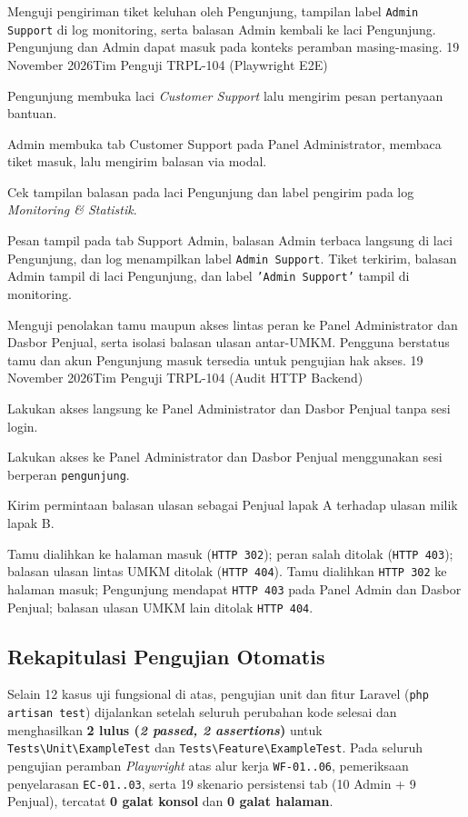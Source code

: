 {Menguji pengiriman tiket keluhan oleh Pengunjung, tampilan label \texttt{Admin Support} di log monitoring, serta balasan Admin kembali ke laci Pengunjung.}
{Pengunjung dan Admin dapat masuk pada konteks peramban masing-masing.}
{19 November 2026}{Tim Penguji TRPL-104 (Playwright E2E)}
{\begin{uclist}
  \item Pengunjung membuka laci \textit{Customer Support} lalu mengirim pesan pertanyaan bantuan.
  \item Admin membuka tab Customer Support pada Panel Administrator, membaca tiket masuk, lalu mengirim balasan via modal.
  \item Cek tampilan balasan pada laci Pengunjung dan label pengirim pada log \textit{Monitoring \& Statistik}.
\end{uclist}}
{Pesan tampil pada tab Support Admin, balasan Admin terbaca langsung di laci Pengunjung, dan log menampilkan label \texttt{Admin Support}.}
{Tiket terkirim, balasan Admin tampil di laci Pengunjung, dan label \texttt{'Admin Support'} tampil di monitoring.}

{Menguji penolakan tamu maupun akses lintas peran ke Panel Administrator dan Dasbor Penjual, serta isolasi balasan ulasan antar-UMKM.}
{Pengguna berstatus tamu dan akun Pengunjung masuk tersedia untuk pengujian hak akses.}
{19 November 2026}{Tim Penguji TRPL-104 (Audit HTTP Backend)}
{\begin{uclist}
  \item Lakukan akses langsung ke Panel Administrator dan Dasbor Penjual tanpa sesi login.
  \item Lakukan akses ke Panel Administrator dan Dasbor Penjual menggunakan sesi berperan \texttt{pengunjung}.
  \item Kirim permintaan balasan ulasan sebagai Penjual lapak A terhadap ulasan milik lapak B.
\end{uclist}}
{Tamu dialihkan ke halaman masuk (\texttt{HTTP 302}); peran salah ditolak (\texttt{HTTP 403}); balasan ulasan lintas UMKM ditolak (\texttt{HTTP 404}).}
{Tamu dialihkan \texttt{HTTP 302} ke halaman masuk; Pengunjung mendapat \texttt{HTTP 403} pada Panel Admin dan Dasbor Penjual; balasan ulasan UMKM lain ditolak \texttt{HTTP 404}.}

\subsection{Rekapitulasi Pengujian Otomatis}

Selain 12 kasus uji fungsional di atas, pengujian unit dan fitur Laravel (\texttt{php artisan test}) dijalankan setelah seluruh perubahan kode selesai dan menghasilkan \textbf{2 lulus (\textit{2 passed, 2 assertions})} untuk \texttt{Tests\textbackslash{}Unit\textbackslash{}ExampleTest} dan \texttt{Tests\textbackslash{}Feature\textbackslash{}ExampleTest}. Pada seluruh pengujian peramban \textit{Playwright} atas alur kerja \texttt{WF-01..06}, pemeriksaan penyelarasan \texttt{EC-01..03}, serta 19 skenario persistensi tab (10 Admin + 9 Penjual), tercatat \textbf{0 galat konsol} dan \textbf{0 galat halaman}.
